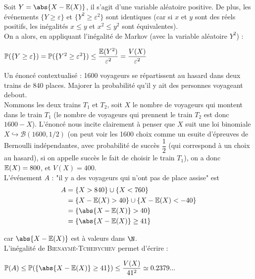 \documentclass[12pt,a4paper]{report}
\begin{document}
\begin{demo}{}
Soit $Y = \abs{X-\E(X)}$, il s'agit d'une variable aléatoire positive. De plus, les événements $\{Y \ge \varepsilon\}$ et $\{Y^2 \ge \varepsilon^2\}$ sont identiques (car si $x$ et $y$ sont des réels positifs, les inégalités $x\le y$ et $x^2 \le y^2$ sont équivalentes). \\
On a alors, en appliquant l'inégalité de Markov (avec la variable aléatoire $Y^2$) :
\begin{center}
$\mathbb{P}(\{Y \ge \varepsilon\}) = \mathbb{P}(\{Y^2 \ge \varepsilon^2\}) \le \dfrac{\mathbb{E}(Y^2)}{\varepsilon^2} = \dfrac{V(X)}{\varepsilon^2}$
\end{center}
\end{demo}

\begin{exemple}{}
Un énoncé contextualisé : 1600 voyageurs se répartissent au hasard dans deux trains de 840 places. Majorer la probabilité qu'il y ait des personnes voyageant debout. \\

Nommons les deux trains $T_1$ et $T_2$, soit $X$ le nombre de voyageurs qui montent dans le train $T_1$ (le nombre de voyageurs qui prennent le train $T_2$ est donc $1600-X$). L'énoncé nous incite clairement à penser que $X$ suit une loi binomiale $X \hookrightarrow \mathcal{B}(1600,1/2)$ (on peut voir les 1600 choix comme un esuite d'épreuves de Bernoulli indépendantes, avec probabilité de succès $\dfrac{1}{2}$ (qui correspond à un choix au hasard), si on appelle succès le fait de choisir le train $T_1$), on a donc $\mathbb{E}(X) = 800$, et $V(X) = 400$. \\

L'événement $A$ : "il y a des voyageurs qui n'ont pas de place assise" est 
\begin{align*}
A &= \{X > 840\} \cup \{X < 760 \} \\
&= \{X-\E(X) > 40\} \cup \{X-\E(X) < -40\} \\
&= \{\abs{X-\E(X)} > 40\} \\
&= \{\abs{X-\E(X)} \ge 41\}
\end{align*}

car $\abs{X-\E(X)}$ est à valeurs dans $\N$. \\

L'inégalité de \textsc{Bienaymé-Tchebychev} permet d'écrire :
\begin{center}
$\p(A) \le \p(\{\abs{X-\E(X)} \ge 41\}) \le \dfrac{V(X)}{41^2} \simeq 0.2379...$
\end{center}


\end{exemple}
\end{document}
